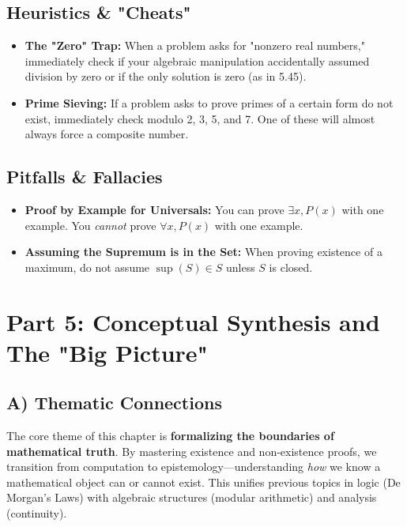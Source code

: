 \documentclass[11pt, a4paper]{article}
\theoremstyle{definition}
\theoremstyle{remark}
\begin{document}
\subsection{Heuristics \& "Cheats"}
\begin{itemize}
    \item \textbf{The "Zero" Trap:} When a problem asks for "nonzero real numbers," immediately check if your algebraic manipulation accidentally assumed division by zero or if the only solution is zero (as in 5.45).
    \item \textbf{Prime Sieving:} If a problem asks to prove primes of a certain form do not exist, immediately check modulo 2, 3, 5, and 7. One of these will almost always force a composite number.
\end{itemize}

\subsection{Pitfalls \& Fallacies}
\begin{itemize}
    \item \textbf{Proof by Example for Universals:} You can prove $\exists x, P(x)$ with one example. You \textit{cannot} prove $\forall x, P(x)$ with one example.
    \item \textbf{Assuming the Supremum is in the Set:} When proving existence of a maximum, do not assume $\sup(S) \in S$ unless $S$ is closed.
\end{itemize}

\newpage

\section{Part 5: Conceptual Synthesis and The "Big Picture"}

\subsection{A) Thematic Connections}
The core theme of this chapter is \textbf{formalizing the boundaries of mathematical truth}. By mastering existence and non-existence proofs, we transition from computation to epistemology—understanding \textit{how} we know a mathematical object can or cannot exist. This unifies previous topics in logic (De Morgan's Laws) with algebraic structures (modular arithmetic) and analysis (continuity).
\end{document}
